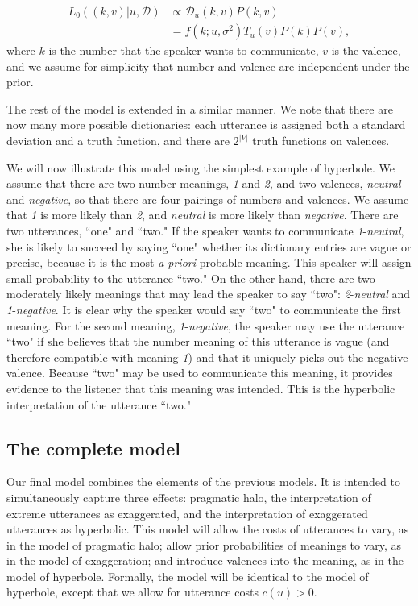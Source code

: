\documentclass{article} %
\newcommand{\dictionary}{\ensuremath{\mathcal{D}}\xspace}
\begin{document}
\begin{align}\label{eq:valenceliteral}
L_0((k,v) | u, \dictionary) &\propto \dictionary_u(k,v)P(k,v) \\
&=f(k;u,\sigma^2)T_u(v)P(k)P(v),
\end{align}
where $k$ is the number that the speaker wants to communicate, $v$ is the valence, and we assume for simplicity that number and valence are independent under the prior. 

The rest of the model is extended in a similar manner. We note that there are now many more possible dictionaries: each utterance is assigned both a standard deviation and a truth function, and there are $2^{|V|}$ truth functions on valences. 

We will now illustrate this model using the simplest example of hyperbole. We assume that there are two number meanings, \emph{1} and \emph{2}, and two valences, \emph{neutral} and \emph{negative}, so that there are four pairings of numbers and valences. We assume that \emph{1} is more likely than \emph{2}, and \emph{neutral} is more likely than \emph{negative}. There are two utterances, ``one" and ``two." If the speaker wants to communicate \emph{1}-\emph{neutral}, she is likely to succeed by saying ``one" whether its dictionary entries are vague or precise, because it is the most \emph{a priori} probable meaning. This speaker will assign small probability to the utterance ``two." On the other hand, there are two moderately likely meanings that may lead the speaker to say ``two": \emph{2}-\emph{neutral} and \emph{1}-\emph{negative}. It is clear why the speaker would say ``two" to communicate the first meaning. For the second meaning, \emph{1}-\emph{negative}, the speaker may use the utterance ``two" if she believes that the number meaning of this utterance is vague (and therefore compatible with meaning \emph{1}) and that it uniquely picks out the negative valence. Because ``two" may be used to communicate this meaning, it provides evidence to the listener that this meaning was intended. This is the hyperbolic interpretation of the utterance ``two." 

\subsection{The complete model}

Our final model combines the elements of the previous models. It is intended to simultaneously capture three effects: pragmatic halo, the interpretation of extreme utterances as exaggerated, and the interpretation of exaggerated utterances as hyperbolic. This model will allow the costs of utterances to vary, as in the model of pragmatic halo; allow prior probabilities of meanings to vary, as in the model of exaggeration; and introduce valences into the meaning, as in the model of hyperbole. Formally, the model will be identical to the model of hyperbole, except that we allow for utterance costs $c(u) > 0$. 
\end{document}
